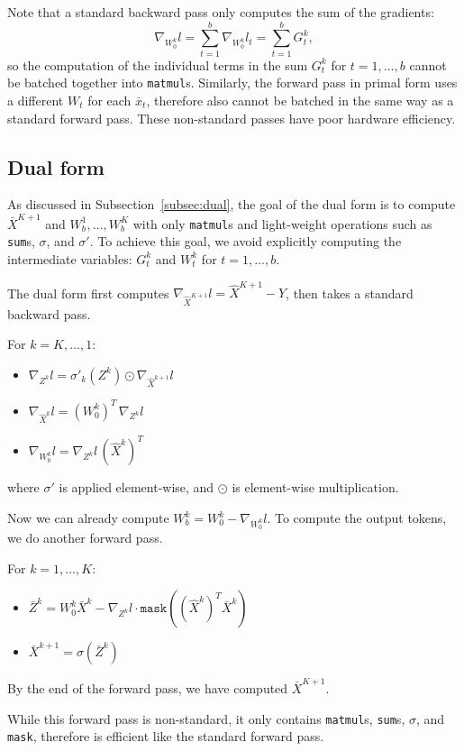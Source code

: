\documentclass{article}
\begin{document}
Note that a standard backward pass only computes the sum of the gradients:
$$
\nabla_{W_0^k}l  = \sum_{t=1}^b \nabla_{W^k_0}l_t = \sum_{t=1}^b G^k_t,
$$
so the computation of the individual terms in the sum $G^k_t$ for $t=1,\dots,b$ cannot be batched together into \texttt{matmul}s.
Similarly, the forward pass in primal form uses a different $W_t$ for each $\bar{x}_t$, therefore also cannot be batched in the same way as a standard forward pass.
These non-standard passes have poor hardware efficiency.

\subsection{Dual form}
As discussed in Subsection~\ref{subsec:dual}, the goal of the dual form is to compute $\bar{X}^{K+1}$ and $W_b^1,\dots,W_b^K$ with only \texttt{matmul}s and light-weight operations such as \texttt{sum}s, $\sigma$, and $\sigma'$.
To achieve this goal, we avoid explicitly computing the intermediate variables: $G^k_t$ and $W^k_t$ for $t=1,\dots,b$.

The dual form first computes 
$\nabla_{\hat{X}^{K+1}}l = \hat{X}^{K+1} - Y$, then takes a standard backward pass.

For $k = K,\dots,1$:
\begin{itemize}
    \item $\nabla_{Z^k}l = \sigma'_k\left( Z^k \right)\odot\nabla_{\hat{X}^{k+1}}l$
    \item $\nabla_{\hat{X}^k}l = \left(W_0^k\right)^T \, \nabla_{Z^k}l$
    \item $\nabla_{W_0^k}l = \nabla_{Z^k}l \, \left(\hat{X}^k\right)^T$
\end{itemize}
where $\sigma'$ is applied element-wise, and $\odot$ is element-wise multiplication.

Now we can already compute $W_b^k = W_0^k - \nabla_{W_0^k}l$.
To compute the output tokens, we do another forward pass.

For $k = 1,\dots,K$:
\begin{itemize}
    \item $\bar{Z}^k = W_0^k\bar{X}^k - \nabla_{Z^k}l\cdot \texttt{mask}\left( \left(\hat{X}^k\right)^T\bar{X}^k \right)$
    \item $\bar{X}^{k+1} = \sigma\left(\bar{Z}^k\right)$
\end{itemize}
By the end of the forward pass, we have computed $\bar{X}^{K+1}$.

While this forward pass is non-standard, it only contains \texttt{matmul}s, \texttt{sum}s, $\sigma$, and \texttt{mask}, therefore is efficient like the standard forward pass.
\end{document}
